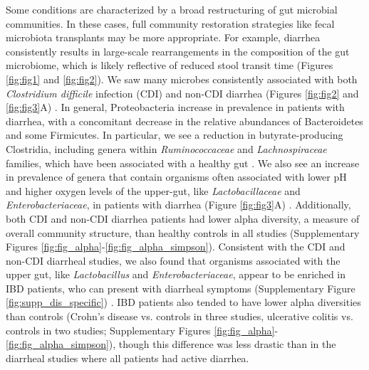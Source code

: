Some conditions are characterized by a broad restructuring of gut microbial communities.
In these cases, full community restoration strategies like fecal microbiota transplants may be more appropriate.
For example, diarrhea consistently results in large-scale rearrangements in the composition of the gut microbiome, which is likely reflective of reduced stool transit time (Figures \ref{fig:fig1} and \ref{fig:fig2}).
We saw many microbes consistently associated with both \textit{Clostridium difficile} infection (CDI) and non-CDI diarrhea (Figures \ref{fig:fig2} and \ref{fig:fig3}A) \cite{cdi-youngster,cdi-schubert,cdi-vincent,edd-singh}.
In general, Proteobacteria increase in prevalence in patients with diarrhea, with a concomitant decrease in the relative abundances of Bacteroidetes and some Firmicutes.
In particular, we see a reduction in butyrate-producing Clostridia, including genera within \textit{Ruminococcaceae} and \textit{Lachnospiraceae} families, which have been associated with a healthy gut \cite{wong2006colonic}.
We also see an increase in prevalence of genera that contain organisms often associated with lower pH and higher oxygen levels of the upper-gut, like \textit{Lactobacillaceae} and \textit{Enterobacteriaceae}, in patients with diarrhea (Figure \ref{fig:fig3}A) \cite{donaldson2016gut}.
Additionally, both CDI and non-CDI diarrhea patients had lower alpha diversity, a measure of overall community structure, than healthy controls in all studies (Supplementary Figures \ref{fig:fig_alpha}-\ref{fig:fig_alpha_simpson}).
Consistent with the CDI and non-CDI diarrheal studies, we also found that organisms associated with the upper gut, like \textit{Lactobacillus} and \textit{Enterobacteriaceae}, appear to be enriched in IBD patients, who can present with diarrheal symptoms (Supplementary Figure \ref{fig:supp_dis_specific}) \cite{donaldson2016gut,Kirsner1982ibd}.
IBD patients also tended to have lower alpha diversities than controls (Crohn's disease vs. controls in three studies, ulcerative colitis vs. controls in two studies; Supplementary Figures \ref{fig:fig_alpha}-\ref{fig:fig_alpha_simpson}), though this difference was less drastic than in the diarrheal studies where all patients had active diarrhea.

